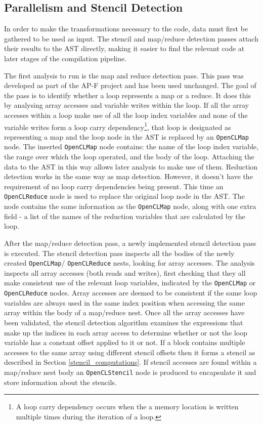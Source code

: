 \documentclass{mpaper}
\begin{document}
\subsection{Parallelism and Stencil Detection}
\label{parallelism_and_stencil_detection}

In order to make the transformations necessary to the code, data must first be gathered to be used as input. 
The stencil and map/reduce detection passes attach their results to the AST directly, making it easier to find the relevant code at later stages of the compilation pipeline.

The first analysis to run is the map and reduce detection pass.
This pass was developed as part of the AP-F project and has been used unchanged.
The goal of the pass is to identify whether a loop represents a map or a reduce.
It does this by analysing array accesses and variable writes within the loop.
If all the array accesses within a loop make use of all the loop index variables and none of the variable writes form a loop carry dependency\footnote{A loop carry dependency occurs when the a memory location is written multiple times during the iteration of a loop.}, that loop is designated as representing a map and the loop node in the AST is replaced by an \texttt{OpenCLMap} node. 
The inserted \texttt{OpenCLMap} node contains: the name of the loop index variable, the range over which the loop operated, and the body of the loop.
Attaching the data to the AST in this way allows later analysis to make use of them.
Reduction detection works in the same way as map detection.
However, it doesn't have the requirement of no loop carry dependencies being present.
This time an \texttt{OpenCLReduce} node is used to replace the original loop node in the AST.
The node contains the same information as the \texttt{OpenCLMap} node, along with one extra field - a list of the names of the reduction variables that are calculated by the loop.

After the map/reduce detection pass, a newly implemented stencil detection pass is executed. 
The stencil detection pass inspects all the bodies of the newly created \texttt{OpenCLMap}/ \texttt{OpenCLReduce} nests, looking for array accesses. 
The analysis inspects all array accesses (both reads and writes), first checking that they all make consistent use of the relevant loop variables, indicated by the \texttt{OpenCLMap} or \texttt{OpenCLReduce} nodes.
Array accesses are deemed to be consistent if the same loop variables are always used in the same index position when accessing the same array within the body of a map/reduce nest. 
Once all the array accesses have been validated, the stencil detection algorithm examines the expressions that make up the indices in each array access to determine whether or not the loop variable has a constant offset applied to it or not.
If a block contains multiple accesses to the same array using different stencil offsets then it forms a stencil as described in Section \ref{stencil_computations}.
If stencil accesses are found within a map/reduce nest body an \texttt{OpenCLStencil} node is produced to encapsulate it and store information about the stencils.
\end{document}

